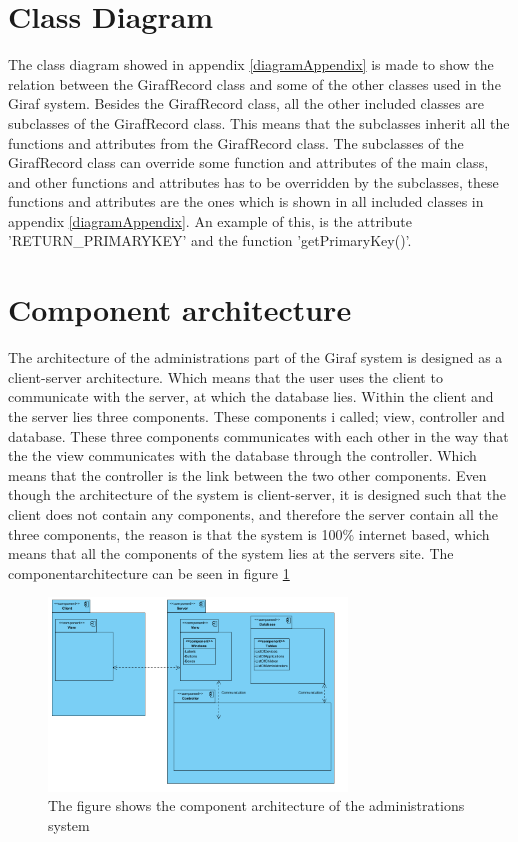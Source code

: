\section{Class Diagram}

The class diagram showed in appendix \ref{diagramAppendix} is made to show the relation between the GirafRecord class and some of the other classes used in the Giraf system.
Besides the GirafRecord class, all the other included classes are subclasses of the GirafRecord class. This means that the subclasses inherit all the functions and attributes from the GirafRecord class.
The subclasses of the GirafRecord class can override some function and attributes of the main class, and other functions and attributes has to be overridden by the subclasses, these functions and attributes are the ones which is shown in all included classes in appendix \ref{diagramAppendix}.
An example of this, is the attribute 'RETURN\_PRIMARYKEY' and the function 'getPrimaryKey()'.
   
\section{Component architecture}

The architecture of the administrations part of the Giraf system is designed as a client-server architecture. Which means that the user uses the client to communicate with the server, at which the database lies. Within the client and the server lies three components. These components i called; view, controller and database. These three components communicates with each other in the way that the the view communicates with the database through the controller. Which means that the controller is the link between the two other components. Even though the architecture of the system is client-server, it is designed such that the client does not contain any components, and therefore the server contain all the three components, the reason is that the system is 100\% internet based, which means that all the components of the system lies at the servers site. The componentarchitecture can be seen in figure \ref{fig:architecture}

\begin{figure}[!ht]
\centering
\includegraphics[width=300px]{img/ComponentArketektur.png}
\caption{The figure shows the component architecture of the administrations system}
\label{fig:architecture}
\end{figure}

